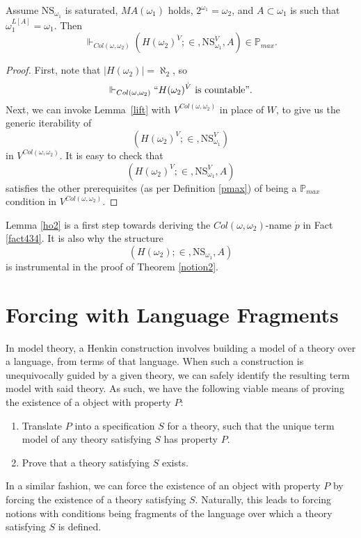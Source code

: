 \documentclass[12pt]{article}
\numberwithin{equation}{section}
\begin{document}
\begin{lem}\label{ho2}
Assume $\mathrm{NS}_{\omega_1}$ is saturated, $MA(\omega_1)$ holds, $2^{\omega_1} = \omega_2$, and $A \subset \omega_1$ is such that $\omega_1^{L[A]} = \omega_1$. Then $$\Vdash_{Col(\omega, \omega_2)} (H(\omega_2)^{\dot{V}}; \in, \mathrm{NS}_{\omega_1}^{\dot{V}}, A) \in \mathbb{P}_{max}.$$
\end{lem}
\begin{proof}
First, note that $|H(\omega_2)| = \aleph_2$, so $$\Vdash_{Col(\omega, \omega_2)} ``H(\omega_2)^{\dot{V}} \text{ is countable}".$$ Next, we can invoke Lemma~\ref{lift} with $V^{Col(\omega, \omega_2)}$ in place of $W$, to give us the generic iterability of $$(H(\omega_2)^{V}; \in, \mathrm{NS}_{\omega_1}^V)$$ in $V^{Col(\omega, \omega_2)}$. It is easy to check that $$(H(\omega_2)^{V}; \in, \mathrm{NS}_{\omega_1}^V, A)$$ satisfies the other prerequisites (as per Definition \ref{pmax}) of being a $\mathbb{P}_{max}$ condition in $V^{Col(\omega, \omega_2)}$. 
\end{proof}

Lemma \ref{ho2} is a first step towards deriving the $Col(\omega, \omega_2)$-name $\dot{p}$ in Fact \ref{fact434}. It is also why the structure 
\begin{equation*}
    (H(\omega_2); \in, \mathrm{NS}_{\omega_1}, A)
\end{equation*}
is instrumental in the proof of Theorem \ref{notion2}.

\section{Forcing with Language Fragments}\label{setupsec}

In model theory, a Henkin construction involves building a model of a theory over a language, from terms of that language. When such a construction is unequivocally guided by a given theory, we can safely identify the resulting term model with said theory. As such, we have the following viable means of proving the existence of a object with property $P$: 
\begin{enumerate}
    \item Translate $P$ into a specification $S$ for a theory, such that the unique term model of any theory satisfying $S$ has property $P$.
    \item Prove that a theory satisfying $S$ exists.
\end{enumerate}
In a similar fashion, we can force the existence of an object with property $P$ by forcing the existence of a theory satisfying $S$. Naturally, this leads to forcing notions with conditions being fragments of the language over which a theory satisfying $S$ is defined.
\end{document}
